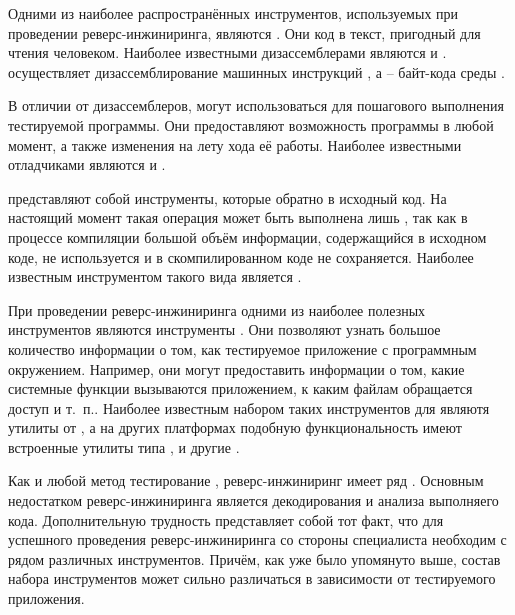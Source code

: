 %
Одними из наиболее распространённых инструментов, используемых при проведении реверс-инжиниринга, являются . 
%
Они  код в текст, пригодный для чтения человеком. 
%
Наиболее известными дизассемблерами являются   и  . 
%
 осуществляет дизассемблирование машинных инструкций , а  -- байт-кода среды  .

%
В отличии от дизассемблеров,  могут использоваться для пошагового выполнения тестируемой программы. 
%
Они предоставляют возможность  программы в любой момент, а также изменения на лету хода её работы. Наиболее известными отладчиками являются   и  .

%
 представляют собой инструменты, которые  обратно в исходный код. 
%
На настоящий момент такая операция может быть выполнена лишь , так как в процессе компиляции большой объём информации, содержащийся в исходном коде, не используется и в скомпилированном коде не сохраняется. 
%
Наиболее известным инструментом такого вида является  .

%
При проведении реверс-инжиниринга одними из наиболее полезных инструментов являются инструменты . 
%
Они позволяют узнать большое количество информации о том, как тестируемое приложение  с программным окружением. 
%
Например, они могут предоставить информации о том, какие системные функции вызываются приложением, к каким файлам обращается доступ и т. п.. 
%
Наиболее известным набором таких инструментов для    являютя утилиты от  , а на других платформах подобную функциональность имеют встроенные утилиты типа ,  и другие .

%
Как и любой метод тестирование , реверс-инжиниринг имеет ряд  . 
%
Основным недостатком реверс-инжиниринга является  декодирования и анализа выполняего кода. 
%
Дополнительную трудность представляет собой тот факт, что для успешного проведения реверс-инжиниринга со стороны специалиста необходим  с рядом различных инструментов. 
%
Причём, как уже было упомянуто выше, состав набора инструментов может сильно различаться в зависимости от тестируемого приложения.

